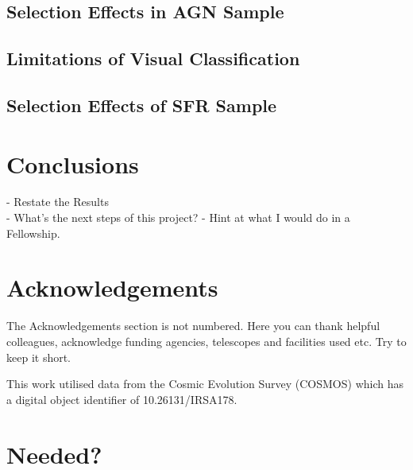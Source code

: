 \documentclass[fleqn,usenatbib]{mnras}
\begin{document}
\subsection{Selection Effects in AGN Sample}

\subsection{Limitations of Visual Classification}

\subsection{Selection Effects of SFR Sample}
 
\section{Conclusions}\label{conclusion}
 - Restate the Results \\
 - What's the next steps of this project?
    - Hint at what I would do in a Fellowship.
 
\section*{Acknowledgements}
The Acknowledgements section is not numbered. Here you can thank helpful
colleagues, acknowledge funding agencies, telescopes and facilities used etc.
Try to keep it short.

This work utilised data from the Cosmic Evolution Survey (COSMOS) which has a digital object identifier of 10.26131/IRSA178.







\appendix

\section{Needed?}




\bsp	%
\label{lastpage}
\end{document}
